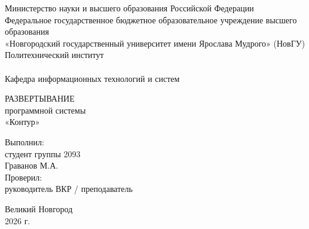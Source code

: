 \begin{titlepage}
\begin{center}

Министерство науки и высшего образования Российской Федерации
\\
Федеральное государственное бюджетное образовательное учреждение 
высшего образования
\\
«Новгородский государственный университет имени Ярослава Мудрого» (НовГУ)
\\
Политехнический институт
\\
\tiny\underline{\hspace{16cm}}
\\
\normalsize \lsstyle Кафедра информационных технологий и систем
\\
\end{center}

\vspace*{25mm}

\begin{center}
РАЗВЕРТЫВАНИЕ
\\
программной системы
\\
«Контур»
\\
\end{center}

\vspace*{20mm}

\begin{flushright}
\begin{minipage}[t]{0.52\textwidth}
Выполнил:
\\
студент группы 2093
\\
Граванов М.А.
\\
Проверил:
\\
руководитель ВКР / преподаватель
\\
\underline{\hspace{55mm}}
\end{minipage}
\end{flushright}

\vfill

\begin{center}
Великий Новгород
\\
2026 г.
\end{center}
\end{titlepage}
\restoregeometry
\addtocounter{page}{1}
